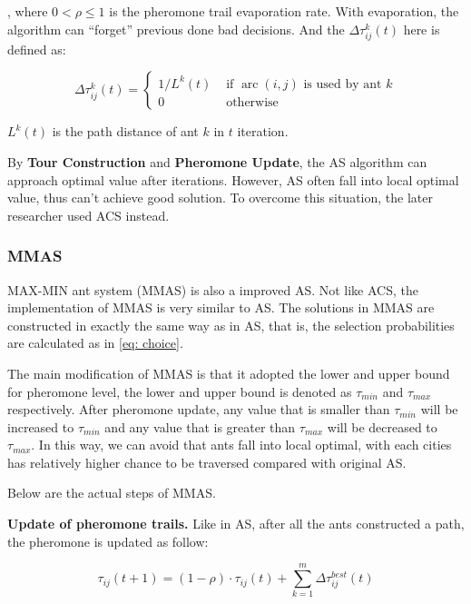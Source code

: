 \documentclass[twocolumn, a4paper]{extarticle}
\begin{document}
, where $0 < \rho \leq 1$ is the pheromone trail evaporation rate. With evaporation, the algorithm can ``forget'' previous done bad decisions. And the $\Delta \tau_{i j}^k(t)$ here is defined as:

\begin{equation}
	\Delta \tau_{i j}^k(t)=\left\{\begin{array}{cl}
		1 / L^k(t) & \text { if } \operatorname{arc}(i, j) \text { is used by ant } k \\
		0 & \text { otherwise }
	\end{array}\right.
\end{equation}

$L^k(t)$ is the path distance of ant $k$ in $t$ iteration.

By \textbf{Tour Construction} and \textbf{Pheromone Update}, the AS algorithm can approach optimal value after iterations. However, AS often fall into local optimal value, thus can't achieve good solution. To overcome this situation, the later researcher used ACS instead. 

\subsubsection{MMAS}

MAX-MIN ant system (MMAS)\cite{stutzle2000max} is also a improved AS. Not like ACS, the implementation of MMAS is very similar to AS. The solutions in MMAS are constructed in exactly the same way as in AS, that is, the selection probabilities are calculated as in \autoref{eq: choice}. 

The main modification of MMAS is that it adopted the lower and upper bound for pheromone level, the lower and upper bound is denoted as $\tau_{min}$ and $\tau_{max}$ respectively. After pheromone update, any value that is smaller than $\tau_{min}$ will be increased to $\tau_{min}$ and any value that is greater than $\tau_{max}$ will be decreased to $\tau_{max}$. In this way, we can avoid that ants fall into local optimal, with each cities has relatively higher chance to be traversed compared with original AS.

Below are the actual steps of MMAS.

\textbf{Update of pheromone trails.} Like in AS, after all the ants constructed a path, the pheromone is updated as follow:

\begin{equation}
	\label{eq: mmas}
	\tau_{i j}(t+1)=(1-\rho) \cdot \tau_{i j}(t)+\sum_{k=1}^m \Delta \tau_{i j}^{best}(t)
\end{equation}
\end{document}
